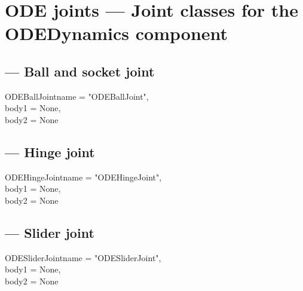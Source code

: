 
\section{ODE joints ---
         Joint classes for the ODEDynamics component}

\subsection{ --- Ball and socket joint}

\begin{classdesc}{ODEBallJoint}{name = "ODEBallJoint",\\ 
                             body1 = None, \\
                             body2 = None
                             }

\end{classdesc}

\subsection{ --- Hinge joint}

\begin{classdesc}{ODEHingeJoint}{name = "ODEHingeJoint",\\ 
                             body1 = None, \\
                             body2 = None
                             }

\end{classdesc}

\subsection{ --- Slider joint}

\begin{classdesc}{ODESliderJoint}{name = "ODESliderJoint",\\ 
                             body1 = None, \\
                             body2 = None
                             }

\end{classdesc}


